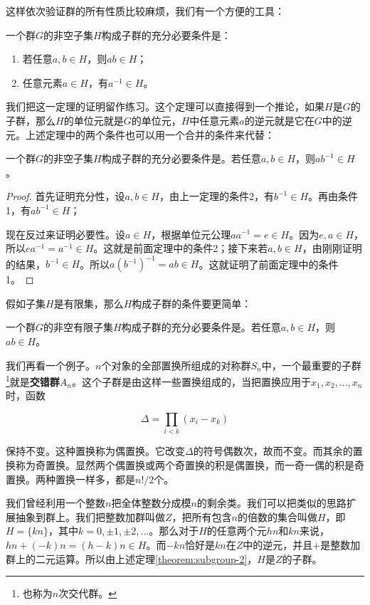 \documentclass[b5paper]{ctexart}
\begin{document}
这样依次验证群的所有性质比较麻烦，我们有一个方便的工具：

\begin{theorem}
一个群$G$的非空子集$H$构成子群的充分必要条件是：
\begin{enumerate}
\item 若任意$a, b \in H$，则$ab \in H$；
\item 任意元素$a \in H$，有$a^{-1} \in H$。
\end{enumerate}
\label{theorem:subgroup}
\end{theorem}

我们把这一定理的证明留作练习。这个定理可以直接得到一个推论，如果$H$是$G$的子群，那么$H$的单位元就是$G$的单位元，$H$中任意元素$a$的逆元就是它在$G$中的逆元。上述定理中的两个条件也可以用一个合并的条件来代替：

\begin{theorem}
一个群$G$的非空子集$H$构成子群的充分必要条件是。若任意$a, b \in H$，则$ab^{-1} \in H$。
\label{theorem:subgroup-2}
\end{theorem}

\begin{proof}
首先证明充分性，设$a, b \in H$，由上一定理的条件2，有$b^{-1} \in H$。再由条件1，有$ab^{-1} \in H$；

现在反过来证明必要性。设$a \in H$，根据单位元公理$aa^{-1} = e \in H$。因为$e, a \in H$，所以$ea^{-1} = a^{-1} \in H$。这就是前面定理中的条件2；接下来若$a, b \in H$，由刚刚证明的结果，$b^{-1} \in H$。所以$a(b^{-1})^{-1} = ab \in H$。这就证明了前面定理中的条件1。
\end{proof}

假如子集$H$是有限集，那么$H$构成子群的条件要更简单：

\begin{theorem}
一个群$G$的非空有限子集$H$构成子群的充分必要条件是。若任意$a, b \in H$，则$ab \in H$。
\end{theorem}

我们再看一个例子。$n$个对象的全部置换所组成的对称群$S_n$中，一个最重要的子群\footnote{也称为$n$次交代群。}就是\textbf{交错群}$A_n$。这个子群是由这样一些置换组成的，当把置换应用于$x_1, x_2, ..., x_n$时，函数

\[
\Delta = \displaystyle \prod_{i < k} (x_i - x_k)
\]

保持不变。这种置换称为偶置换。它改变$\Delta$的符号偶数次，故而不变。而其余的置换称为奇置换。显然两个偶置换或两个奇置换的积是偶置换，而一奇一偶的积是奇置换。两种置换一样多，都是$n!/2$个。

我们曾经利用一个整数$n$把全体整数分成模$n$的剩余类。我们可以把类似的思路扩展抽象到群上。我们把整数加群叫做$Z$，把所有包含$n$的倍数的集合叫做$H$，即$H = \{ kn \}$，其中$k = 0, \pm 1, \pm 2, ...$。那么对于$H$的任意两个元$hn$和$kn$来说，$hn + (-k)n = (h - k)n \in H$。而$-kn$恰好是$kn$在$Z$中的逆元，并且$+$是整数加群上的二元运算。所以由上述定理\ref{theorem:subgroup-2}，$H$是$Z$的子群。
\end{document}
